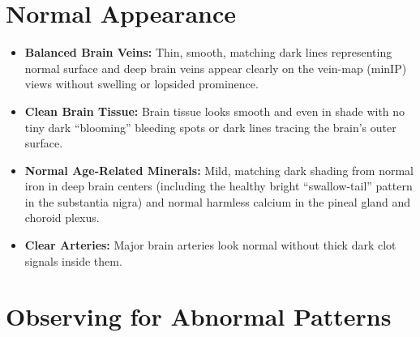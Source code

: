 \section{Normal Appearance}

\begin{itemize}
    \item \textbf{Balanced Brain Veins:} Thin, smooth, matching dark lines representing normal surface and deep brain veins appear clearly on the vein-map (minIP) views without swelling or lopsided prominence.
    \item \textbf{Clean Brain Tissue:} Brain tissue looks smooth and even in shade with no tiny dark ``blooming'' bleeding spots or dark lines tracing the brain's outer surface.
    \item \textbf{Normal Age-Related Minerals:} Mild, matching dark shading from normal iron in deep brain centers (including the healthy bright ``swallow-tail'' pattern in the substantia nigra) and normal harmless calcium in the pineal gland and choroid plexus.
    \item \textbf{Clear Arteries:} Major brain arteries look normal without thick dark clot signals inside them.
\end{itemize}

\section{Observing for Abnormal Patterns}

